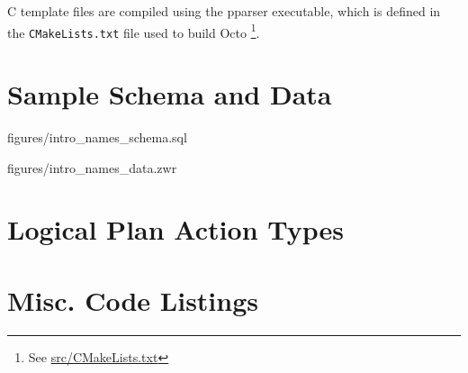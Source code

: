 \documentclass[]{article}
\def\code#1{\texttt{#1}}
\newcommand{\gitlab}[1]{\footnote{See \href{https://gitlab.com/YottaDB/DBMS/YDBOcto/blob/master/#1}{#1}}}
\begin{document}
C template files are compiled using the pparser executable, which is defined in the \code{CMakeLists.txt} file used to build Octo \gitlab{src/CMakeLists.txt}.

\appendix
\appendixpage
\addappheadtotoc

\section{Sample Schema and Data}


{figures/intro_names_schema.sql}


{figures/intro_names_data.zwr}

\section{Logical Plan Action Types}



\section{Misc. Code Listings}





\end{document}
